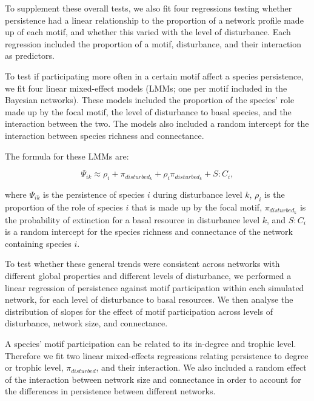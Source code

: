 \documentclass[12pt]{article}
\begin{document}
\begin{spacing}{2.0}
            To supplement these overall tests, we also fit four regressions testing whether persistence had a linear relationship to the proportion of a network profile made up of each motif, and whether this varied with the level of disturbance.
            Each regression included the proportion of a motif, disturbance, and their interaction as predictors.
        
            To test if participating more often in a certain motif affect a species persistence, we fit four linear mixed-effect models (LMMs; one per motif included in the Bayesian networks).
            These models included the proportion of the species' role made up by the focal motif, the level of disturbance to basal species, and the interaction between the two. The models also included a random intercept for the interaction between species richness and connectance.

            The formula for these LMMs are:       
            
            \begin{equation}
                \Psi_{ik} \approx \rho_{i} + \pi_{disturbed_k} + \rho_{i}\pi_{disturbed_k} +
                S:C_{i} ,
                \label{propreq}
            \end{equation}

            where $\Psi_{ik}$ is the persistence of species $i$ during disturbance level $k$, $\rho_{i}$ is the proportion of the role of species $i$ that is made up by the focal motif, $\pi_{disturbed_k}$ is the probability of extinction for a basal resource in disturbance level $k$, and $S:C_{i}$ is a random intercept for the species richness and connectance of the network containing species $i$.
    
            To test whether these general trends were consistent across networks with different global properties and different levels of disturbance, we performed a linear regression of persistence against motif participation within each simulated network, for each level of disturbance to basal resources. We then analyse the distribution of slopes for the effect of motif participation across levels of disturbance, network size, and connectance. 

            A species' motif participation can be related to its in-degree and trophic level. Therefore we fit two linear mixed-effects regressions relating persistence to degree or trophic level, $\pi_{disturbed}$, and their interaction. We also included a random effect of the interaction between network size and connectance in order to account for the differences in persistence between different networks. 


\end{spacing}
\end{document}
